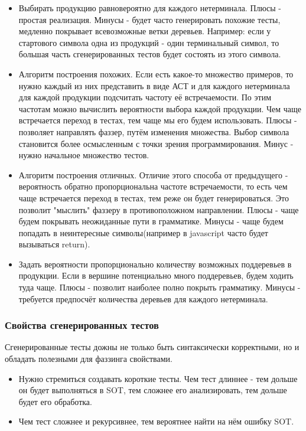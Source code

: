 \documentclass[a4paper]{article}
\begin{document}
\begin{itemize}
\item Выбирать продукцию равновероятно для каждого нетерминала. Плюсы - простая реализация. Минусы - будет часто генерировать похожие тесты, медленно покрывает всевозможные ветки деревьев. Например: если у стартового символа одна из продукций - один терминальный символ, то большая часть сгенерированных тестов будет состоять из этого символа.
\item Алгоритм построения похожих. Если есть какое-то множество примеров, то нужно каждый из них представить в виде АСТ и для каждого нетерминала для каждой продукции подсчитать частоту её встречаемости. По этим частотам можно вычислить вероятности выбора каждой продукции. Чем чаще встречается переход в тестах, тем чаще мы его будем использовать. Плюсы - позволяет направлять фаззер, путём изменения множества. Выбор символа становится более осмысленным с точки зрения программирования. Минус - нужно начальное множество тестов.
\item Алгоритм построения отличных. Отличие этого способа от предыдущего - вероятность обратно пропорциональна частоте встречаемости, то есть чем чаще встречается переход в тестах, тем реже он будет генерироваться. Это позволит "мыслить" фаззеру в противоположном направлении. Плюсы - чаще будем покрывать неожиданные пути в грамматике. Минусы - чаще будем попадать в неинтересные символы(например в javascript часто будет вызываться return). 
\item Задать вероятности пропорционально количеству возможных поддеревьев в продукции. Если в вершине потенциально много поддеревьев, будем ходить туда чаще.
Плюсы - позволит наиболее полно покрыть грамматику. 
Минусы - требуется предпосчёт количества деревьев для каждого нетерминала.
\end{itemize}

\subsubsection{Свойства сгенерированных тестов}
\indent

Сгенерированные тесты дожны не только быть синтаксически корректными, но и обладать полезными для фаззинга свойствами.

\begin{itemize}
\item Нужно стремиться создавать короткие тесты. Чем тест длиннее - тем дольше он будет выполняться в SOT, тем сложнее его анализировать, тем дольше будет его обработка. 
\item Чем тест сложнее и рекурсивнее, тем вероятнее найти на нём ошибку SOT. 
\end{itemize}
\end{document}
